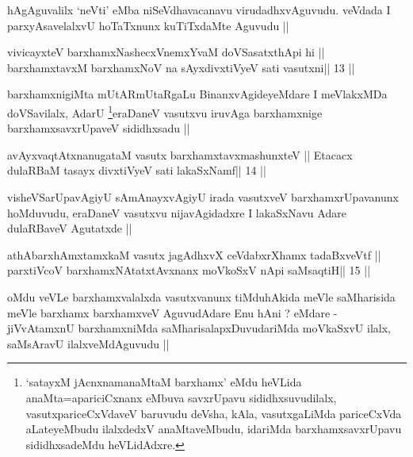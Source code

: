 \begin{artha}
hAgAguvalilx `neVti' eMba niSeVdhavacanavu virudadhxvAguvudu. veVdada
I parxyAsavelalxvU hoTaTxnunx kuTiTxdaMte Aguvudu ||
\end{artha}


\begin{shl}
vivicayxteV barxhamxNashecxVnemxYvaM doVSasatxthA\s pi hi ||
barxhamxtavxM barxhamxNoV na sAyxdivxtiVyeV sati vasutxni\hfill || 13 ||
\end{shl}

\begin{artha}
barxhamxnigiMta mUtARmUtaRgaLu BinanxvAgideyeMdare I meVlakxMDa
doVSavilalx, AdarU \footnote[1]{`satayxM jAcnxnamanaMtaM barxhamx'
  eMdu heVLida anaMta=apariciCxnanx eMbuva savxrUpavu
  sididhxsuvudilalx, vasutxpariceCxVdaveV baruvudu deVsha, kAla,
  vasutxgaLiMda pariceCxVda aLateyeMbudu ilalxdedxV anaMtaveMbudu,
  idariMda barxhamxsavxrUpavu sididhxsadeMdu heVLidAdxre.}eraDaneV 
  vasutxvu iruvAga barxhamxnige barxhamxsavxrUpaveV sididhxsadu ||
\end{artha}


\begin{shl}
avAyxvaqtAtxnanugataM vasutx barxhamxtavxmashunxteV ||
Etacacx dulaRBaM tasayx divxtiVyeV sati lakaSxNamf\hfill || 14 ||
\end{shl}

\begin{artha}
visheVSarUpavAgiyU sAmAnayxvAgiyU irada vasutxveV barxhamxrUpavanunx
hoMduvudu, eraDaneV vasutxvu nijavAgidadxre I lakaSxNavu Adare
dulaRBaveV Agutatxde ||
\end{artha}


\begin{shl}
athAbarxhAmxtamxkaM vasutx jagAdhxvX ceVdabxrXhamx tadaBxveVtf ||
parxtiVcoV barxhamxNA\s tatxtAvxnanx moVkoSxV nApi saMsaqtiH\hfill || 15 ||
\end{shl}

\begin{artha}
oMdu veVLe barxhamxvalalxda vasutxvanunx tiMduhAkida meVle saMharisida
meVle barxhamx barxhamxveV AguvudAdare Enu hAni ? eMdare - jiVvAtamxnU
barxhamxniMda saMharisalapxDuvudariMda moVkaSxvU ilalx, saMsAravU
ilalxveMdAguvudu ||
\end{artha}


